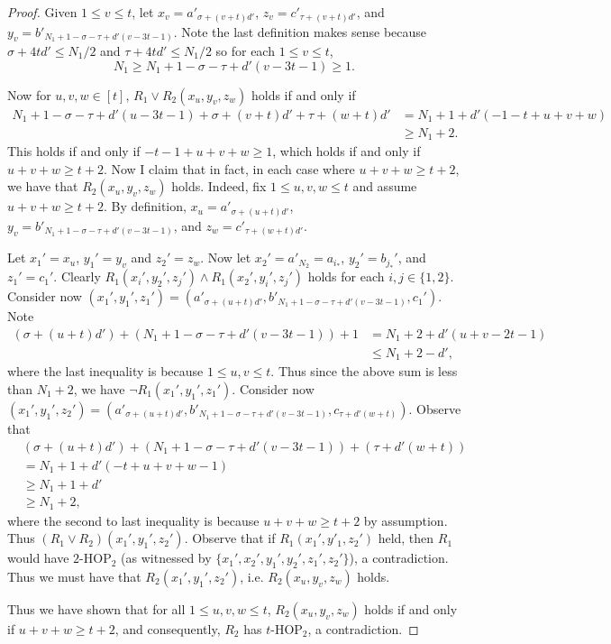 \documentclass[12pt,oneside,british,a4wide]{amsart}
\numberwithin{equation}{section}
\theoremstyle{definition}
\def\HOP{\mathrm{HOP}}
\begin{document}
\begin{proof}
Given $1\leq v\leq t$, let $x_v=a'_{\sigma+(v+t)d'}$, $z_v=c'_{\tau+(v+t)d'}$, and $y_v=b'_{N_1+1-\sigma-\tau+d'(v-3t-1)}$.  Note the last definition makes sense because $\sigma+4td'\leq N_1/2$ and $\tau+4td'\leq N_1/2$  so for each $1\leq v\leq t$,
$$
N_1\geq N_1+1-\sigma-\tau+d'(v-3t-1)\geq 1.
$$

Now for $u,v,w\in [t]$, $R_1\vee R_2(x_u,y_v,z_w)$ holds if and only if
\begin{align*}
N_1+1-\sigma-\tau+d'(u-3t-1)+\sigma+(v+t)d'+\tau+(w+t)d'&=N_1+1+d'(-1-t+u+v+w)\\
&\geq N_1+2.
\end{align*}
This holds if and only if $-t-1+u+v+w\geq 1$, which holds if and only if $u+v+w\geq t+2$.  Now I claim that in fact, in each case where $u+v+w\geq t+2$, we have that $R_2(x_u,y_v,z_w)$ holds.  Indeed, fix $1\leq u,v,w\leq t$ and assume $u+v+w\geq t+2$.  By definition, $x_u=a'_{\sigma+(u+t)d'}$, $y_v=b'_{N_1+1-\sigma-\tau+d'(v-3t-1)}$, and $z_w=c'_{\tau+(w+t)d'}$.  



Let $x_1'=x_u$, $y_1'=y_v$ and $z_2'=z_w$.  Now let $x_2'=a'_{N_2}=a_{i_*}$, $y_2'=b_{j_*}'$, and $z_1'=c_1'$.  Clearly $R_1(x_i',y_2',z_j')\wedge R_1(x_2',y_i',z_j')$ holds for each $i,j\in \{1,2\}$.  Consider now $(x_1', y_1', z_1')=(a'_{\sigma+(u+t)d'},b'_{N_1+1-\sigma-\tau+d'(v-3t-1)}, c_1')$.  Note
\begin{align*}
(\sigma+(u+t)d')+(N_1+1-\sigma-\tau+d'(v-3t-1))+1&=N_1+2+d'(u+v-2t-1)\\
&\leq N_1+2-d',
\end{align*}
where the last inequality is because $1\leq u,v\leq t$.  Thus since the above sum is less than $N_1+2$, we have $\neg R_1(x_1',y_1',z_1')$.  Consider now $(x_1',y_1',z_2')=(a'_{\sigma+(u+t)d'},b'_{N_1+1-\sigma-\tau+d'(v-3t-1)}, c_{\tau+d'(w+t)})$.  Observe that
\begin{align*}
&(\sigma+(u+t)d')+(N_1+1-\sigma-\tau+d'(v-3t-1))+(\tau+d'(w+t))\\
&=N_1+1+d'(-t+u+v+w-1)\\
&\geq N_1+1+d'\\
&\geq N_1+2,
\end{align*}
where the second to last inequality is because $u+v+w\geq t+2$ by assumption.  Thus $(R_1\vee R_2)(x_1',y_1',z_2')$.  Observe that if $R_1(x_1',y'_1,z_2')$ held, then $R_1$ would have $2$-$\HOP_2$  (as witnessed by $\{x_1',x_2',y_1',y_2',z_1',z_2'\}$), a contradiction.  Thus we must have that $R_2(x_1',y_1',z_2')$, i.e. $R_2(x_u,y_v,z_w)$ holds.

Thus we have shown that for all $1\leq u,v,w\leq t$, $R_2(x_u,y_v,z_w)$ holds if and only if $u+v+w\geq t+2$, and consequently, $R_2$ has $t$-$\HOP_2$, a contradiction.
\end{proof}
\end{document}
